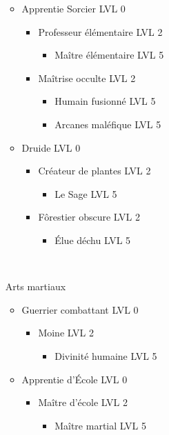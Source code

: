 \begin{itemize}
\begin{itemize}
\begin{itemize}
				\end{itemize}
			\item Apprentie Sorcier LVL 0
				\begin{itemize}
					\item Professeur élémentaire LVL 2
						\begin{itemize}
							\item Maître élémentaire LVL 5
						\end{itemize}
					\item Maîtrise occulte LVL 2
						\begin{itemize}
							\item Humain fusionné LVL 5
							\item Arcanes maléfique LVL 5
						\end{itemize}
				\end{itemize}
			\item Druide LVL 0
				\begin{itemize}
					\item Créateur de plantes LVL 2
						\begin{itemize}
							\item Le Sage LVL 5
						\end{itemize}
					\item Fôrestier obscure LVL 2
						\begin{itemize}
							\item Élue déchu LVL 5
						\end{itemize}
				\end{itemize}
		\end{itemize}
		~\\
	\item[Arts martiaux] ~\\
		\begin{itemize}
			\item Guerrier combattant LVL 0
				\begin{itemize}
					\item Moine LVL 2
						\begin{itemize}
							\item Divinité humaine LVL 5
						\end{itemize}
				\end{itemize}
			\item Apprentie d'École LVL 0
				\begin{itemize}
					\item Maître d'école LVL 2
						\begin{itemize}
							\item Maître martial LVL 5

\end{itemize}
\end{itemize}
\end{itemize}
\end{itemize}
